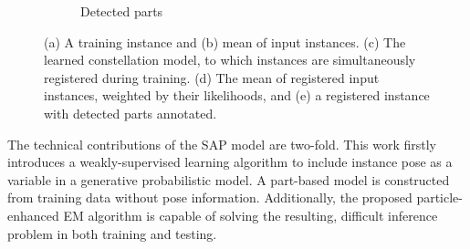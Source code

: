 \begin{figure}[ht]
\begin{subfigure}[b]{0.28\linewidth}
	\caption{Detected parts}
	\label{fig/reg/concept5}
\end{subfigure}
\caption{(a) A training instance and (b) mean of input instances. (c) The learned constellation model, to which instances are simultaneously registered during training. (d) The mean of registered input instances, weighted by their likelihoods, and (e) a registered instance with detected parts annotated.}
\label{fig/reg/concept}
\end{figure}

The technical contributions of the SAP model are two-fold. 
This work firstly introduces a weakly-supervised learning algorithm to include instance pose as a variable in a generative probabilistic model. A part-based model is constructed from training data without pose information. Additionally, the proposed particle-enhanced EM algorithm is capable of solving the resulting, difficult inference problem in both training and testing.  



